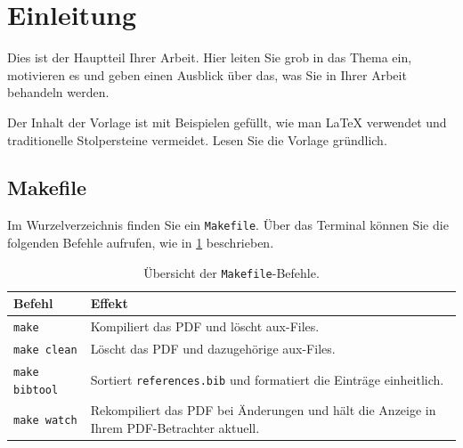 %
%

\section{Einleitung}

Dies ist der Hauptteil Ihrer Arbeit.
Hier leiten Sie grob in das Thema ein, motivieren es und geben einen Ausblick
über das, was Sie in Ihrer Arbeit behandeln werden.

Der Inhalt der Vorlage ist mit Beispielen gefüllt, wie man \LaTeX{}
verwendet und traditionelle Stolpersteine vermeidet.
Lesen Sie die Vorlage gründlich.


\subsection{Makefile}

Im Wurzelverzeichnis finden Sie ein \texttt{Makefile}.
Über das Terminal können Sie die folgenden Befehle aufrufen,
wie in \cref{tab:make} beschrieben.


\begin{table}[h]
  \centering
  \caption{Übersicht der \texttt{Makefile}-Befehle.}%
  \label{tab:make}
  \begin{tabularx}{\textwidth}{lX}
    \toprule
    Befehl & Effekt \\
    \midrule
    \texttt{make} & Kompiliert das PDF und löscht aux-Files. \\
    \texttt{make clean} & Löscht das PDF und dazugehörige aux-Files. \\
    \texttt{make bibtool} & Sortiert \texttt{references.bib}
    und formatiert die Einträge einheitlich. \\
    \texttt{make watch} & Rekompiliert das PDF bei Änderungen und
    hält die Anzeige in Ihrem PDF-Betrachter aktuell. \\
    \bottomrule
  \end{tabularx}
\end{table}


